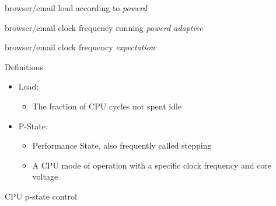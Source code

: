 \documentclass[aspectratio=169]{beamer}
\begin{document}
\begin{frame}{browser/email load according to \emph{powerd}}
\end{frame}

\begin{frame}{browser/email clock frequency running \emph{powerd adaptive}}
\end{frame}

\begin{frame}{browser/email clock frequency \emph{expectation}}
\end{frame}

\begin{frame}{Definitions}
\begin{itemize}
\item Load: \begin{itemize}
      \item<2-> The fraction of CPU cycles not spent idle
      \end{itemize}
\item<3-> P-State: \begin{itemize}
      \item<4-> Performance State, also frequently called stepping
      \item<5-> A CPU mode of operation with a specific clock frequency
                and core voltage
      \end{itemize}
\end{itemize}
\end{frame}

\begin{frame}{CPU p-state control}
\centering
{}
\end{frame}
\end{document}
